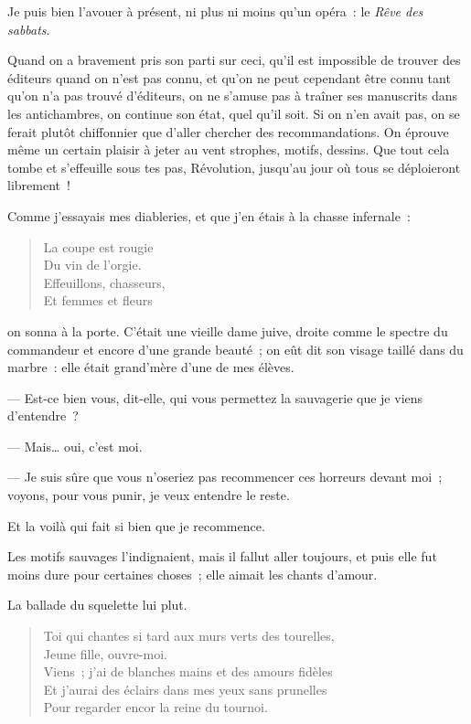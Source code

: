 \documentclass[french,twoside]{book} %
\begin{document}
Je puis bien l’avouer à présent, ni plus ni moins qu’un opéra : le \emph{Rêve des sabbats}.\par
Quand on a bravement pris son parti sur ceci, qu’il est impossible de trouver des éditeurs quand on n’est pas connu, et qu’on ne peut cependant être connu tant qu’on n’a pas trouvé d’éditeurs, on ne s’amuse pas à traîner ses manuscrits dans les antichambres, on continue son état, quel qu’il soit. Si on n’en avait pas, on se ferait plutôt chiffonnier que d’aller chercher des recommandations. On éprouve même un certain plaisir à jeter au vent strophes, motifs, dessins. Que tout cela tombe et s’effeuille sous tes pas, Révolution, jusqu’au jour où tous se déploieront librement !\par
Comme j’essayais mes diableries, et que j’en étais à la chasse infernale :\par
 

\begin{verse}
La coupe est rougie\\
Du vin de l’orgie.\\
Effeuillons, chasseurs,\\
Et femmes et fleurs\\
\end{verse}

\noindent on sonna à la porte. C’était une vieille dame juive, droite comme le spectre du commandeur et encore d’une grande beauté ; on eût dit son visage taillé dans du marbre : elle était grand’mère d’une de mes élèves.\par
— Est-ce bien vous, dit-elle, qui vous permettez la sauvagerie que je viens d’entendre ?\par
— Mais… oui, c’est moi.\par
— Je suis sûre que vous n’oseriez pas recommencer ces horreurs devant moi ; voyons, pour vous punir, je veux entendre le reste.\par
Et la voilà qui fait si bien que je recommence.\par
Les motifs sauvages l’indignaient, mais il fallut aller toujours, et puis elle fut moins dure pour certaines choses ; elle aimait les chants d’amour.\par
La ballade du squelette lui plut.\par


\begin{verse}
Toi qui chantes si tard aux murs verts des tourelles,\\
\hspace{1em}\hspace{1em}\hspace{1em}Jeune fille, ouvre-moi.\\
Viens ; j’ai de blanches mains et des amours fidèles\\
Et j’aurai des éclairs dans mes yeux sans prunelles\\
Pour regarder encor la reine du tournoi.\\
\end{verse}
\end{document}
